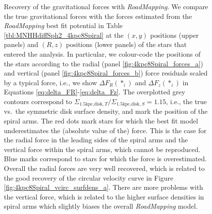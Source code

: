 \documentclass[iop,revtex4,numberedappendix,appendixfloats]{emulateapj}
\newcommand{\RM}{{\sl RoadMapping}}
\begin{document}
\begin{figure}[!htbp]
\centering
\caption{Recovery of the gravitational forces with \RM{}. We compare the true gravitational forces with the forces estimated from the \RM{} best fit potential in Table \ref{tbl:MNHHdiffSph2_4kpc8Spiral} at the $(x,y)$ positions (upper panels) and $(R,z)$ positions (lower panels) of the stars that entered the analysis. In particular, we colour-code the positions of the stars according to the radial (panel \ref{fig:4kpc8Spiral_forces_a}) and vertical (panel \ref{fig:4kpc8Spiral_forces_b}) force residuals scaled by a typical force, i.e., we show $\Delta F_R(*_i)$ and $\Delta F_z(*_i)$ in Equations \eqref{eq:delta_FR}-\eqref{eq:delta_Fz}. The overplotted grey contours correspond to $\Sigma_{\text{1.5kpc,disk},T}/\Sigma_{\text{1.5kpc,disk},S}=1.15$, i.e., the true vs.\ the symmetric disk surface density, and mark the position of the spiral arms. The red dots mark stars for which the best fit model underestimates the (absolute value of the) force. This is the case for the radial force in the leading sides of the spiral arms and the vertical force within the spiral arms, which cannot be reproduced. Blue marks correspond to stars for which the force is overestimated. Overall the radial forces are very well recovered, which is related to the good recovery of the circular velocity curve in Figure \ref{fig:4kpc8Spiral_vcirc_surfdens_a}. There are more problems with the vertical force, which is related to the higher surface densities in spiral arms which slightly biases the overall \RM{} model.}

\end{figure}
\end{document}
